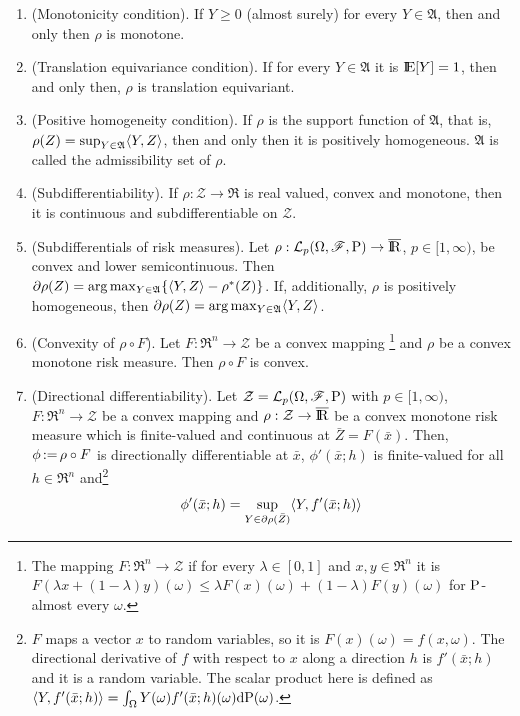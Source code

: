 \documentclass[a4paper,10pt]{article}
\begin{document}
\begin{enumerate}
 \item (Monotonicity condition). If $Y\geq 0$ (almost surely) for every $Y\in \mathfrak{A}$, 
       then and only then $\rho$ is monotone.
       
 \item (Translation equivariance condition). If for every $Y\in\mathfrak{A}$ it is $\E[Y]=1$,
       then and only then, $\rho$ is translation equivariant.
       
 \item (Positive homogeneity condition). If $\rho$ is the support function of $\mathfrak{A}$, 
       that is, $\rho(Z) = \sup_{Y\in\mathfrak{A}}\langle Y,Z\rangle$, then and only then it is positively homogeneous.
       $\mathfrak{A}$ is called the admissibility set of $\rho$.
       
 \item (Subdifferentiability). If $\rho:\mathcal{Z}\to\Re$ is real valued, convex and monotone, 
       then it is continuous and subdifferentiable on $\mathcal{Z}$.
 \item (Subdifferentials of risk measures). Let $\rho:\mathcal{L}_p\ofp \to \barre$, $p\in [1,\infty)$,
        be convex and lower semicontinuous. Then $\partial \rho(Z) = \arg\max_{Y\in\mathfrak{A}} \{\langle Y,Z\rangle - \rho^*(Z)\}$.
        If, additionally, $\rho$ is positively homogeneous, then $\partial \rho(Z) = \arg\max_{Y\in\mathfrak{A}}\langle Y,Z\rangle$.
 \item (Convexity of $\rho\circ F$). Let $F:\Re^n\to\mathcal{Z}$ be a convex mapping%
       \footnote{The mapping $F:\Re^n\to\mathcal{Z}$ if for every $\lambda\in[0,1]$ and $x,y\in\Re^n$
                 it is $F(\lambda x + (1-\lambda)y)(\omega) \leq \lambda F(x)(\omega) + (1-\lambda)F(y)(\omega)$
                 for $\mathrm{P}$-almost every $\omega$.} and $\rho$ be a convex
       monotone risk measure. Then $\rho\circ F$ is convex. 
 \item (Directional differentiability). Let $\mathcal{Z}=\mathcal{L}_p(\Omega,\mathscr{F},\mathrm{P})$ with $p\in[1,\infty)$,
       $F:\Re^n\to\mathcal{Z}$ be a convex mapping and $\rho:\mathcal{Z}\to\barre$ be a convex monotone 
       risk measure which is finite-valued and continuous at $\bar{Z} = F(\bar{x})$.
       Then, $\phi{}\mathop{\mathrel{:}=}{} \rho\circ F$ is directionally differentiable at $\bar{x}$,
       $\phi'(\bar{x};h)$ is finite-valued for all $h\in\Re^n$ and\footnote{%
       $F$ maps a vector $x$ to random variables, so it is $F(x)(\omega)=f(x,\omega)$. The directional derivative of $f$ with 
       respect to $x$ along a direction $h$ is $f'(\bar{x}; h)$ and it is a random variable. The scalar product here is defined as
       $\langle Y, f'(\bar{x}; h)\rangle = \int_{\Omega} Y(\omega) f'(\bar{x}; h)(\omega) \mathrm{d} \mathrm{P}(\omega)$.}
       \[
        \phi'(\bar{x}; h) = \sup_{Y \in \partial \rho(\bar{Z})}\langle Y, f'(\bar{x}; h)\rangle
       \]
       

\end{enumerate}
\end{document}

